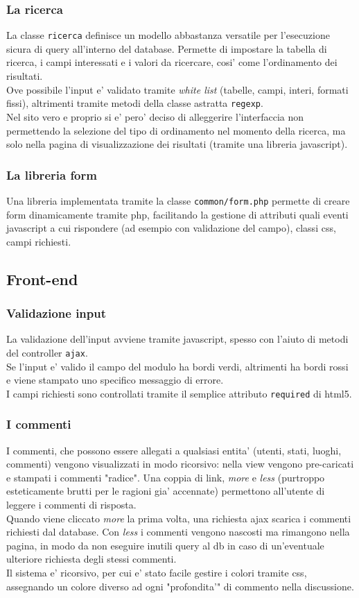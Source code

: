 \documentclass{article}
\begin{document}
\subsubsection{La ricerca}
La classe \texttt{ricerca} definisce un modello abbastanza versatile per l'esecuzione sicura di query all'interno del database.
Permette di impostare la tabella di ricerca, i campi interessati e i valori da ricercare, cosi' come l'ordinamento dei risultati.
\\
Ove possibile l'input e' validato tramite \emph{white list} (tabelle, campi, interi, formati fissi), altrimenti tramite metodi della classe astratta \texttt{regexp}.
\\
Nel sito vero e proprio si e' pero' deciso di alleggerire l'interfaccia non permettendo la selezione del tipo di ordinamento nel momento della ricerca, ma solo nella pagina di visualizzazione dei risultati (tramite una libreria javascript).
\subsubsection{La libreria form}
Una libreria implementata tramite la classe \texttt{common/form.php} permette di creare form dinamicamente tramite php, facilitando la gestione di attributi quali eventi javascript a cui rispondere (ad esempio con validazione del campo), classi css, campi richiesti.


\subsection{Front-end}
\subsubsection{Validazione input}
La validazione dell'input avviene tramite javascript, spesso con l'aiuto di metodi del controller \texttt{ajax}.
\\
Se l'input e' valido il campo del modulo ha bordi verdi, altrimenti ha bordi rossi e viene stampato uno specifico messaggio di errore.
\\
I campi richiesti sono controllati tramite il semplice attributo \texttt{required} di html5.
\subsubsection{I commenti}
I commenti, che possono essere allegati a qualsiasi entita' (utenti, stati, luoghi, commenti) vengono visualizzati in modo ricorsivo: nella view vengono pre-caricati e stampati i commenti "radice". Una coppia di link, \emph{more} e \emph{less} (purtroppo esteticamente brutti per le ragioni gia' accennate) permettono all'utente di leggere i commenti di risposta.
\\
Quando viene cliccato \emph{more} la prima volta, una richiesta ajax scarica i commenti richiesti dal database. Con \emph{less} i commenti vengono nascosti ma rimangono nella pagina, in modo da non eseguire inutili query al db in caso di un'eventuale ulteriore richiesta degli stessi commenti.
\\
Il sistema e' ricorsivo, per cui e' stato facile gestire i colori tramite css, assegnando un colore diverso ad ogni "profondita'" di commento nella discussione.
\end{document}
